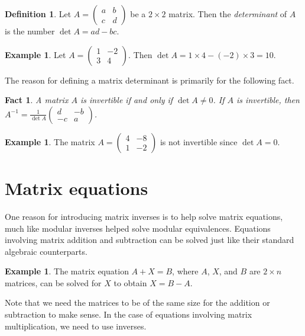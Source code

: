 \documentclass{book}
\theoremstyle{plain}
\newtheorem{fact}[theorem]{Fact}
\theoremstyle{definition}
\newtheorem{definition}[theorem]{Definition}
\newtheorem{example}[theorem]{Example}
\begin{document}
\begin{definition}
Let $A = \begin{pmatrix} a & b \\ c & d \end{pmatrix}$ be a $2 \times 2$ matrix. Then the {\it determinant} of $A$ is the number $\det A = ad - bc$.
\end{definition}

\begin{example}
Let $A = \begin{pmatrix} 1 & -2 \\ 3 & 4 \end{pmatrix}$. Then $\det A = 1 \times 4 - (-2) \times 3 = 10$.
\end{example}

The reason for defining a matrix determinant is primarily for the following fact.

\begin{fact}
A matrix $A$ is invertible if and only if $\det A \neq 0$. If $A$ is invertible, then $A^{-1} = \frac{1}{\det A}\begin{pmatrix} d & -b \\ -c & a \end{pmatrix}$.
\end{fact}

\begin{example}
The matrix $A = \begin{pmatrix} 4 & -8 \\ 1 & -2 \end{pmatrix}$ is not invertible since $\det A = 0$.
\end{example}

\section{Matrix equations}
One reason for introducing matrix inverses is to help solve matrix equations, much like modular inverses helped solve modular equivalences. Equations involving matrix addition and subtraction can be solved just like their standard algebraic counterparts.

\begin{example}
The matrix equation $A + X = B$, where $A$, $X$, and $B$ are $2 \times n$ matrices, can be solved for $X$ to obtain $X = B - A$.
\end{example}

Note that we need the matrices to be of the same size for the addition or subtraction to make sense. In the case of equations involving matrix multiplication, we need to use inverses.
\end{document}
